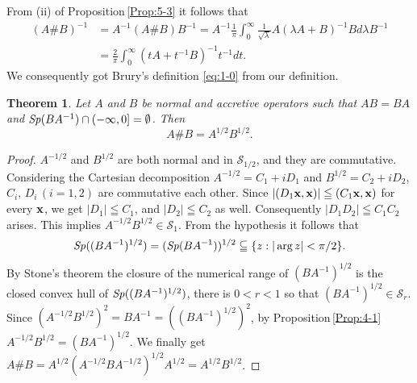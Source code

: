 \documentclass[reqno]{amsart}
\newtheorem{theorem}{Theorem}[section]
\theoremstyle{definition}
\theoremstyle{remark}
\begin{document}
From (ii) of Proposition\,\ref{Prop:5-3} 
it follows that
\begin{align*}
(A\# B)^{-1}& = A^{-1} (A\# B) B^{-1} = A^{-1}\frac{1}{\pi} \int_0^{\infty}\frac{1}{\sqrt{\lambda}}
A (\lambda A + B)^{-1} B d \lambda B^{-1} \\
&= \frac{2}{\pi} \int_0^{\infty} (tA + t^{-1 } B)^{-1} t^{-1} d t.
\end{align*}
We consequently got Brury's definition \eqref{eq:1-0} from our definition. 
\begin{theorem}\label{Th:5-5}
Let $A $ and $B$ be normal and accretive operators 
such that $AB=BA$ and  
${\it Sp}(BA^{-1}) \cap (-\infty, 0] = \emptyset$. Then 
$$A\# B = A^{1/2} B^{1/2}.$$
\end{theorem}
\begin{proof}  $A^{-1/2}$ and $B^{1/2}$ are both normal and in 
$\mathcal{S}_{1/2}$, and they are commutative. Considering the Cartesian 
decomposition       
 $A^{-1/2} = C_1 + i D_1$ and $B^{1/2} = C_2 + i D_2$, $C_i, \,D_i \,(i=1,2)$ are commutative each other. Since 
$|(D_1 {\bf x}, {\bf x})|\leqq (C_1{\bf x} , {\bf x})$ for every ${\bf x}$, 
we get $|D_1|\leqq C_1$,
 and $|D_2|\leqq C_2$ as well.  Consequently $|D_1  D_2|\leqq C_1 C_2$ arises. 
This implies $A^{-1/2} B^{1/2} \in \mathcal{S}_{1}$. From the hypothesis it follows that 
$${\it Sp}((BA^{-1})^{1/2}) = ( {\it Sp}(BA^{-1}) )^{1/2} \subseteqq \{z: |\arg z| < \pi /2\}.$$ 
By Stone's theorem \cite{Stone} the closure of the numerical range of $(BA^{-1})^{1/2}$ is the closed 
convex hull of ${\it Sp}((BA^{-1})^{1/2})$, there is $0<r<1$ so that
 $(BA^{-1})^{1/2}  \in \mathcal{S}_{r}$. Since 
$(A^{-1/2} B^{1/2})^2 = B A^{-1} =( (BA^{-1})^{1/2})^2$, by Proposition\,\ref{Prop:4-1}
 $A^{-1/2} B^{1/2} = (BA^{-1})^{1/2}$. We finally get 
$A\# B = A^{1/2}(A^{-1/2} B A^{-1/2})^{1/2} A^{1/2} = A^{1/2} B^{1/2}$. 
\end{proof}
 
\end{document}
